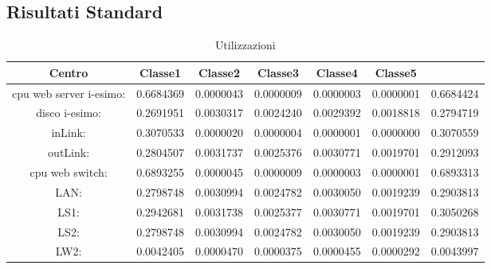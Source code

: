 \subsection{Risultati Standard}
\begin{table}[H]
\begin{center}\begin{scriptsize}
\begin{tabular}{||c|c|c|c|c|c||}
\hline
Centro &Classe1 &Classe2 &Classe3 &Classe4 &Classe5\\
\hline
\hline
 cpu web server i-esimo: 	&0.6684369	&0.0000043	&0.0000009	&0.0000003	&0.0000001	&0.6684424	\\\hline
 disco i-esimo: 	&0.2691951	&0.0030317	&0.0024240	&0.0029392	&0.0018818	&0.2794719	\\\hline
 inLink: 	&0.3070533	&0.0000020	&0.0000004	&0.0000001	&0.0000000	&0.3070559	\\\hline
 outLink: 	&0.2804507	&0.0031737	&0.0025376	&0.0030771	&0.0019701	&0.2912093	\\\hline
 cpu web switch: 	&0.6893255	&0.0000045	&0.0000009	&0.0000003	&0.0000001	&0.6893313	\\\hline
 LAN: 	&0.2798748	&0.0030994	&0.0024782	&0.0030050	&0.0019239	&0.2903813	\\\hline
 LS1: 	&0.2942681	&0.0031738	&0.0025377	&0.0030771	&0.0019701	&0.3050268	\\\hline
 LS2:	&0.2798748	&0.0030994	&0.0024782	&0.0030050	&0.0019239	&0.2903813	\\\hline
 LW2: 	&0.0042405	&0.0000470	&0.0000375	&0.0000455	&0.0000292	&0.0043997	\\\hline
\end{tabular}
\end{scriptsize}\end{center}
\caption{Utilizzazioni}
\label{utilizzazioni}
\end{table}

